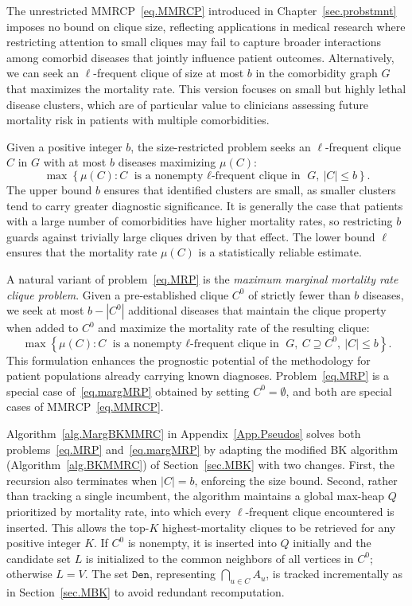 The unrestricted MMRCP~\eqref{eq.MMRCP} introduced in Chapter~\ref{sec.probstmnt}
imposes no bound on clique size, reflecting applications in medical
research where restricting attention to small cliques may fail to
capture broader interactions among comorbid diseases that jointly
influence patient outcomes. Alternatively, we can seek an $\ell$-frequent clique of size at most $b$ in the comorbidity
graph $G$ that maximizes the mortality rate. This version focuses
on small but highly lethal disease clusters, which are of particular
value to clinicians assessing future mortality risk in patients with
multiple comorbidities. 

Given a positive integer $b$, the size-restricted problem seeks an
$\ell$-frequent clique $C$ in $G$ with at most $b$ diseases maximizing
$\mu(C)$:
\begin{equation}
    \label{eq.MRP}
    \max\left\{\mu(C) : C \text{ is a nonempty $\ell$-frequent
    clique in } G,\ |C| \le b\right\}.
\end{equation}
The upper bound $b$ ensures that identified clusters are small, as
smaller clusters tend to carry greater diagnostic significance. It is
generally the case that patients with a large number of comorbidities
have higher mortality rates, so restricting $b$ guards against
trivially large cliques driven by that effect. The lower bound $\ell$
ensures that the mortality rate $\mu(C)$ is a statistically reliable
estimate.

A natural variant of problem~\eqref{eq.MRP} is the \textit{maximum
marginal mortality rate clique problem}. Given a pre-established clique
$C^0$ of strictly fewer than $b$ diseases, we seek at most $b -
|C^0|$ additional diseases that maintain the clique property when
added to $C^0$ and maximize the mortality rate of the resulting clique:
\begin{equation}
    \label{eq.margMRP}
    \max\left\{\mu(C) : C \text{ is a nonempty $\ell$-frequent
    clique in } G,\ C \supseteq C^0,\ |C| \le b \right\}.
\end{equation}
This formulation enhances the prognostic potential of the methodology
for patient populations already carrying known diagnoses.
Problem~\eqref{eq.MRP} is a special case of~\eqref{eq.margMRP}
obtained by setting $C^0 = \emptyset$, and both are special cases of
MMRCP~\eqref{eq.MMRCP}.

Algorithm~\ref{alg.MargBKMMRC} in Appendix~\ref{App.Pseudos} solves
both problems~\eqref{eq.MRP} and~\eqref{eq.margMRP} by adapting
the modified BK algorithm (Algorithm~\ref{alg.BKMMRC}) of Section~\ref{sec.MBK} with two changes.
First, the recursion also terminates when $|C| = b$, enforcing the
size bound. Second, rather than tracking a single incumbent, the
algorithm maintains a global max-heap $Q$ prioritized by mortality
rate, into which every $\ell$-frequent clique encountered is inserted.
This allows the top-$K$ highest-mortality cliques to be retrieved for
any positive integer $K$. If $C^0$ is nonempty, it is inserted into
$Q$ initially and the candidate set $L$ is initialized to the common
neighbors of all vertices in $C^0$; otherwise $L = V$. The set
$\texttt{Den}$, representing $\bigcap_{u \in C} A_u$, is tracked
incrementally as in Section~\ref{sec.MBK} to avoid redundant
recomputation.

